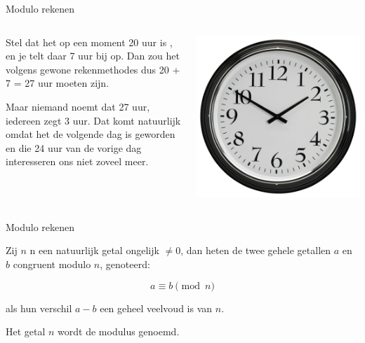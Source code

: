 \documentclass{beamer}
\begin{document}
\begin{frame}{Modulo rekenen}
	\begin{columns}
		\begin{column}[T]{0.5\textwidth}
			Stel dat het op een moment 20 uur is  , en je telt daar 7 uur bij op. Dan zou het volgens gewone rekenmethodes dus 20 + 7 = 27 uur moeten zijn.
			
			Maar niemand noemt dat 27 uur, iedereen zegt 3 uur. Dat komt natuurlijk omdat het de volgende dag is geworden en die 24 uur van de vorige dag interesseren ons niet zoveel meer.
		\end{column}
		
		\begin{column}[T]{0.5\textwidth}
				\includegraphics[width=\textwidth]{img/clock.jpg}
		\end{column}
	\end{columns}
\end{frame}

\begin{frame}{Modulo rekenen}

	Zij $n$ n een natuurlijk getal ongelijk $\neq 0$, dan heten de twee gehele getallen $a$ en $b$ congruent modulo $n$, genoteerd:
	
	\[ 
		a \equiv b \pmod{n}
	\]
	
	als hun verschil $a - b$ een geheel veelvoud is van $n$.
	
	Het getal $n$ wordt de modulus genoemd.
	
\end{frame}
\end{document}
